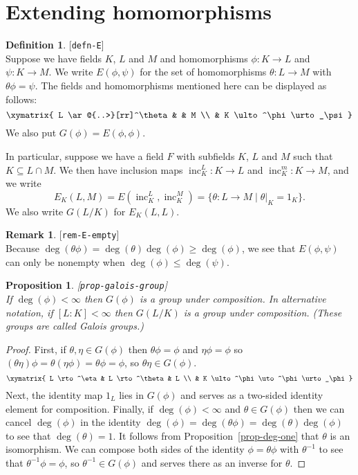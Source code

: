 \documentclass{amsart}
\newcommand{\lbl}[1]{\label{#1}\textup{[\texttt{#1}]}\ \\}
\newcommand{\lbl}{\label}
\newcommand{\inc}       {\operatorname{inc}}
\newcommand{\tht}       {\theta}
\newcommand{\st}        {\;|\;}
\newcommand{\sse}       {\subseteq}
\renewcommand{\:}{\colon}
\newtheorem{proposition}[theorem]{Proposition}
\theoremstyle{definition}
\newtheorem{remark}[theorem]{Remark}
\newtheorem{definition}[theorem]{Definition}
\begin{document}
\section{Extending homomorphisms}
\label{sec-extensions}

\begin{definition}\lbl{defn-E}
 Suppose we have fields $K$, $L$ and $M$ and homomorphisms
 $\phi\:K\to L$ and $\psi\:K\to M$.  We write $E(\phi,\psi)$ for the
 set of homomorphisms $\tht\:L\to M$ with $\tht\phi=\psi$.  The fields
 and homomorphisms mentioned here can be displayed as follows:
 \[ \xymatrix{
      L \ar@{..>}[rr]^\tht & & M \\
      & K \ulto^\phi \urto_\psi
    }
 \]
 We also put $G(\phi)=E(\phi,\phi)$.  

 In particular, suppose we have a field $F$ with subfields $K$, $L$
 and $M$ such that $K\sse L\cap M$.  We then have inclusion maps
 $\inc_K^L\:K\to L$ and $\inc_K^m\:K\to M$, and we write
 \[ E_K(L,M) = E(\inc_K^L,\inc_K^M) = 
     \{\tht\:L\to M\st \tht|_K=1_K\}.
 \]
 We also write $G(L/K)$ for $E_K(L,L)$.
\end{definition}

\begin{remark}\lbl{rem-E-empty}
 Because $\deg(\tht\phi)=\deg(\tht)\deg(\phi)\geq\deg(\phi)$, we see
 that $E(\phi,\psi)$ can only be nonempty when
 $\deg(\phi)\leq\deg(\psi)$. 
\end{remark}

\begin{proposition}\lbl{prop-galois-group}
 If $\deg(\phi)<\infty$ then $G(\phi)$ is a group under composition.
 In alternative notation, if $[L:K]<\infty$ then $G(L/K)$ is a group
 under composition.  (These groups are called \emph{Galois groups}.)
\end{proposition}
\begin{proof}
 First, if $\tht,\eta\in G(\phi)$ then $\tht\phi=\phi$ and
 $\eta\phi=\phi$ so $(\tht\eta)\phi=\tht(\eta\phi)=\tht\phi=\phi$, so
 $\tht\eta\in G(\phi)$.
 \[ \xymatrix{
     L \rto^\eta & L \rto^\tht & L \\
     & K \ulto^\phi \uto^\phi \urto_\phi 
    }
 \]
 Next, the identity map $1_L$ lies in
 $G(\phi)$ and serves as a two-sided identity element for
 composition.  Finally, if $\deg(\phi)<\infty$ and $\tht\in G(\phi)$
 then we can cancel $\deg(\phi)$ in the identity
 $\deg(\phi)=\deg(\tht\phi)=\deg(\tht)\deg(\phi)$ to see that
 $\deg(\tht)=1$.  It follows from Proposition~\ref{prop-deg-one} that
 $\tht$ is an isomorphism.  We can compose both sides of the identity
 $\phi=\tht\phi$ with $\tht^{-1}$ to see that $\tht^{-1}\phi=\phi$, so
 $\tht^{-1}\in G(\phi)$ and serves there as an inverse for $\tht$. 
\end{proof}
\end{document}
